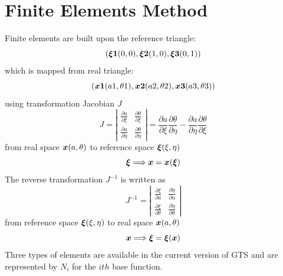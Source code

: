 \documentclass{report}
\newcommand{\bm}[1]{\mbox{\boldmath $#1$}}
\newcommand{\pp}[2]{\frac{\partial{#1}}{\partial{#2}}}
\begin{document}
\section{Finite Elements Method}
Finite elements are built upon the reference triangle:
$$
(\bm{\xi 1}(0,0), \bm{\xi 2}(1,0), \bm{\xi 3}(0,1))
$$
which is mapped from real triangle:
$$
(\bm{x1}(a1,\theta 1), \bm{x2}(a2,\theta 2), \bm{x3}(a3,\theta 3))
$$
using transformation Jacobian $J$ 
\begin{equation}
J = \left| \begin{array}{ll}
        \pp{a}{\xi}  & \pp{\theta}{\xi} \\
        \pp{a}{\eta} & \pp{\theta}{\eta}
    \end{array} \right|
  = \pp{a}{\xi}  \pp{\theta}{\eta} - \pp{a}{\eta} \pp{\theta}{\xi}
\end{equation}
from real space $\bm{x}(a,\theta)$ to reference space $\bm{\xi}(\xi,\eta)$
$$
\bm{\xi} \Longrightarrow \bm{x} = \bm{x}(\bm{\xi})
$$
The reverse transformation $J^{-1}$ is written as
\begin{equation}
J^{-1} = \left| \begin{array}{ll}
             \pp{\xi}{a} & \pp{\eta}{a} \\
             \pp{\xi}{\theta} & \pp{\eta}{\theta}
         \end{array} \right|
\end{equation}
from reference space $\bm{\xi}(\xi,\eta)$ to real space $\bm{x}(a,\theta)$
$$
\bm{x} \Longrightarrow \bm{\xi} = \bm{\xi}(\bm{x})
$$
Three types of elements are available in the current version of GTS
and are represented by $N_i$ for the $ith$ base function.
\end{document}

